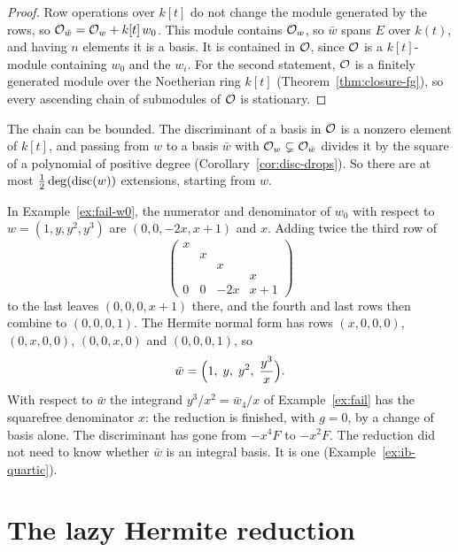 \begin{proof}
Row operations over $k[t]$ do not change the module generated by the rows, so
$\mathcal{O}_{\bar w} = \mathcal{O}_w + k[t]\, w_0$. This module contains $\mathcal{O}_w$, so $\bar w$
spans $E$ over $k(t)$, and having $n$ elements it is a basis. It is contained
in $\mathcal{O}$, since $\mathcal{O}$ is a $k[t]$-module containing $w_0$ and the $w_i$. For
the second statement, $\mathcal{O}$ is a finitely generated module over the Noetherian
ring $k[t]$ (Theorem~\ref{thm:closure-fg}), so every ascending chain of
submodules of $\mathcal{O}$ is stationary.
\end{proof}

The chain can be bounded. The discriminant of a basis in $\mathcal{O}$ is a nonzero
element of $k[t]$, and passing from $w$ to a basis $\bar w$ with $\mathcal{O}_w
\subsetneq \mathcal{O}_{\bar w}$ divides it by the square of a polynomial of positive
degree (Corollary~\ref{cor:disc-drops}). So there are at most
$\frac12 \deg(\operatorname{disc}(w))$ extensions, starting from $w$.

\begin{example}\label{ex:fail-extend}
In Example~\ref{ex:fail-w0}, the numerator and denominator of $w_0$ with
respect to $w = (1, y, y^2, y^3)$ are $(0, 0, -2x, x + 1)$ and $x$. Adding
twice the third row of
\[
  \begin{pmatrix}
    x &   &     &       \\
      & x &     &       \\
      &   & x   &       \\
      &   &     & x     \\
    0 & 0 & -2x & x + 1
  \end{pmatrix}
\]
to the last leaves $(0, 0, 0, x + 1)$ there, and the fourth and last rows
then combine to $(0, 0, 0, 1)$. The Hermite normal form has rows $(x, 0, 0,
0)$, $(0, x, 0, 0)$, $(0, 0, x, 0)$ and $(0, 0, 0, 1)$, so
\[
  \bar w = \Bigl( 1,\; y,\; y^2,\; \frac{y^3}{x} \Bigr) .
\]
With respect to $\bar w$ the integrand $y^3/x^2 = \bar w_4 / x$ of
Example~\ref{ex:fail} has the squarefree denominator $x$: the reduction is
finished, with $g = 0$, by a change of basis alone. The discriminant has
gone from $-x^4 F$ to $-x^2 F$. The reduction did not need to know
whether $\bar w$ is an integral basis. It is one
(Example~\ref{ex:ib-quartic}).
\end{example}

\section{The lazy Hermite reduction}\label{sec:hermite-lazy}

